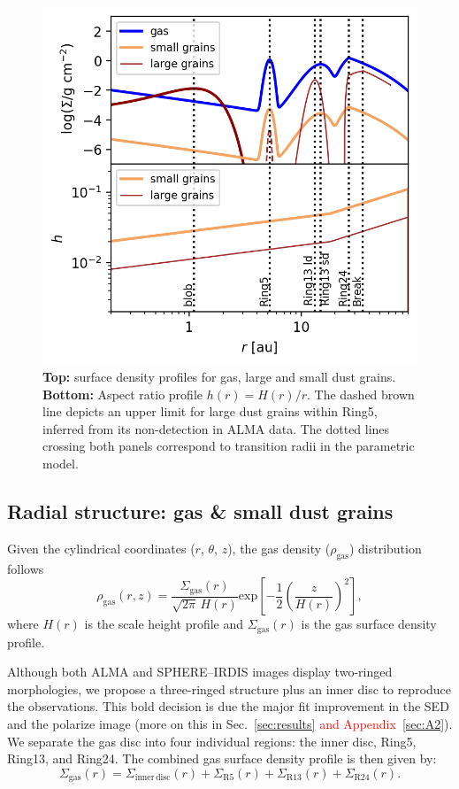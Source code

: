 \documentclass[fleqn,usenatbib,useAMS]{mnras}
\newcommand{\red}[1]{\textcolor{red}{#1}}
\begin{document}
\begin{figure}
	\includegraphics[width=\columnwidth]{allprofiles.png}
        \caption{{\bf Top:} surface density profiles for gas, large and small dust grains. {\bf Bottom:} Aspect ratio profile $h(r)= H(r)/r$. The dashed brown line depicts an upper limit for large dust grains within Ring5, inferred from its non-detection in ALMA data. The dotted lines crossing both panels correspond to transition radii in the parametric model.}
    \label{fig:profiles}
\end{figure}

\subsection{Radial structure: gas \& small dust grains}

Given the cylindrical coordinates ($r$, $\theta$, $z$), the gas density ($\rho_{\mathrm{gas}}$) distribution follows
\begin{equation}
  \rho_{\mathrm{gas}}(r,z) =\frac{\Sigma_{\mathrm{gas}}(r)}{\sqrt{2\pi} \, H(r)} \mathrm{exp}\left[-\frac{1}{2} \left(\frac{z}{H(r)}\right)^2\right],
\end{equation}
where $H(r)$ is the scale height profile and $\Sigma_{\mathrm{gas}}(r)$ is the gas surface density profile.

Although both ALMA and SPHERE--IRDIS images display two-ringed morphologies, we propose a three-ringed structure plus an inner disc to reproduce the observations. This bold decision is due the major fit improvement in the SED and the polarize image (more on this in Sec.~\ref{sec:results} \red{and Appendix~\ref{sec:A2}}). We separate the gas disc into four individual regions: the inner disc, Ring5, Ring13, and Ring24. The combined gas surface density profile is then given by:
\begin{equation}
  \Sigma_{\mathrm{gas}}(r) = \Sigma_{\mathrm{inner\,disc}}(r) + \Sigma_{\mathrm{R5}}(r) + \Sigma_{\mathrm{R13}}(r) + \Sigma_{\mathrm{R24}}(r).
\end{equation}
\end{document}
